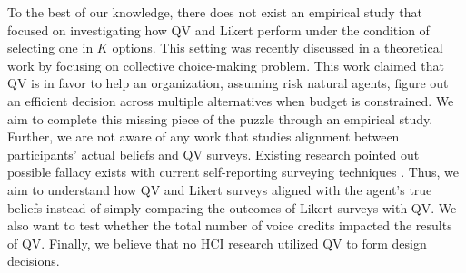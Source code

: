 To the best of our knowledge,
there does not exist an empirical study 
that focused on investigating
how QV and Likert perform
under the condition of selecting
one in $K$ options.
This setting was recently discussed 
in a theoretical work by \textcite{eguia2019quadratic}
focusing on collective choice-making problem.
This work claimed that QV is in favor 
to help an organization,
assuming risk natural agents,
figure out an efficient decision 
across multiple alternatives
when budget is constrained.
We aim to complete this missing piece of the puzzle 
through an empirical study.
Further,
we are not aware of any work
that studies alignment between
participants' actual beliefs
and QV surveys.
Existing research pointed out 
possible fallacy exists 
with current self-reporting surveying techniques
\cite{araujo2017much, vavreck2007exaggerated}.
Thus, we aim to understand
how QV and Likert surveys
aligned with the agent's true beliefs
instead of simply comparing 
the outcomes of Likert surveys with QV.
We also want to test
whether the total number of voice credits 
impacted the results of QV.
Finally, we believe that
no HCI research utilized QV
to form design decisions.